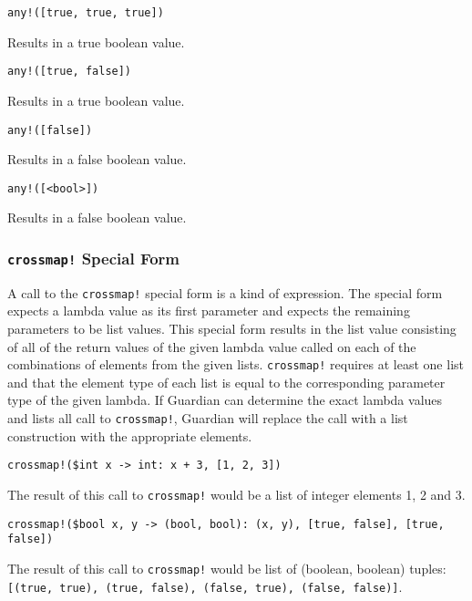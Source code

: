 {{		\begin{itemize}
		{
			\item \texttt{any!([true, true, true])}
			
				Results in a true boolean value.
			
			\item \texttt{any!([true, false])}
			
				Results in a true boolean value.
			
			\item \texttt{any!([false])}
			
				Results in a false boolean value.
			
			\item \texttt{any!([<bool>])}
			
				Results in a false boolean value.
		}
		\end{itemize}
	}
	
	\subsubsection{\texttt{crossmap!} Special Form}
	{
		A call to the \texttt{crossmap!} special form is a kind of expression.
		The special form expects a lambda value as its
		first parameter and expects the remaining parameters to be list values.
		This special form results in the list value consisting
		of all of the return values of the given lambda value called on each of
		the combinations of elements from the given lists.
		\texttt{crossmap!} requires at least one list and that
		the element type of each list is equal to the corresponding parameter type
		of the given lambda.
		If Guardian can determine the exact lambda values and lists all call to
		\texttt{crossmap!}, Guardian will replace the call with a list
		construction with the appropriate elements.
		
		\begin{itemize}
		{
			\item \texttt{crossmap!(\$int x -> int: x + 3, [1, 2, 3])}
			
				The result of this call to \texttt{crossmap!} would be a list of
				integer elements 1, 2 and 3.
			
			\item \texttt{crossmap!(\$bool x, y -> (bool, bool): (x, y), [true, false], [true, false])}
			
				The result of this call to \texttt{crossmap!} would be list of
				(boolean, boolean)
				tuples: \texttt{[(true, true), (true, false), (false, true), (false, false)]}.
		}
		\end{itemize}
	}
	
}
